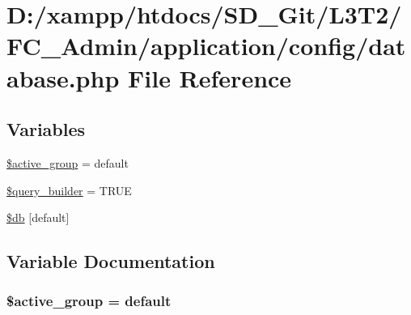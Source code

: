 \hypertarget{database_8php}{}\section{D\+:/xampp/htdocs/\+S\+D\+\_\+\+Git/\+L3\+T2/\+F\+C\+\_\+\+Admin/application/config/database.php File Reference}
\label{database_8php}
\subsection*{Variables}
\begin{DoxyCompactItemize}
\item 
\hyperlink{database_8php_a5046ea83a698c5b7bbf6ffd3dd816b65}{\$active\+\_\+group} = \textquotesingle{}default\textquotesingle{}
\item 
\hyperlink{database_8php_a11d000bc34a3940bb236487b672328bf}{\$query\+\_\+builder} = T\+R\+U\+E
\item 
\hyperlink{database_8php_ad0fb5aa377966ebea235874ccab61f40}{\$db} \mbox{[}\textquotesingle{}default\textquotesingle{}\mbox{]}
\end{DoxyCompactItemize}


\subsection{Variable Documentation}
\hypertarget{database_8php_a5046ea83a698c5b7bbf6ffd3dd816b65}{}
\subsubsection[{\$active\+\_\+group}]{\setlength{\rightskip}{0pt plus 5cm}\$active\+\_\+group = \textquotesingle{}default\textquotesingle{}}\label{database_8php_a5046ea83a698c5b7bbf6ffd3dd816b65}
\hypertarget{database_8php_ad0fb5aa377966ebea235874ccab61f40}{}

